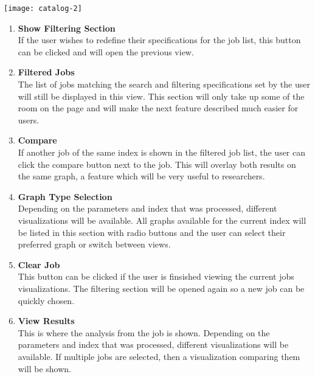 \texttt{[image: catalog-2]}
\begin{enumerate}
    \item \textbf{Show Filtering Section}\\ If the user wishes to redefine their specifications for the job list, this button can be clicked and will open the previous view.
    \item \textbf{Filtered Jobs}\\ The list of jobs matching the search and filtering specifications set by the user will still be displayed in this view. This section will only take up some of the room on the page and will make the next feature described much easier for users.
    \item \textbf{Compare}\\ If another job of the same index is shown in the filtered job list, the user can click the compare button next to the job. This will overlay both results on the same graph, a feature which will be very useful to researchers.
    \item \textbf{Graph Type Selection}\\ Depending on the parameters and index that was processed, different visualizations will be available. All graphs available for the current index will be listed in this section with radio buttons and the user can select their preferred graph or switch between views.
    \item \textbf{Clear Job}\\ This button can be clicked if the user is finsished viewing the current jobs visualizations. The filtering section will be opened again so a new job can be quickly chosen.
    \item \textbf{View Results}\\ This is where the analysis from the job is shown. Depending on the parameters and index that was processed, different visualizations will be available. If multiple jobs are selected, then a visualization comparing them will be shown.
\end{enumerate}